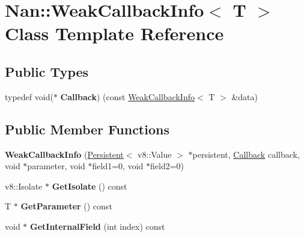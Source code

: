 \hypertarget{class_nan_1_1_weak_callback_info}{}\section{Nan\+:\+:Weak\+Callback\+Info$<$ T $>$ Class Template Reference}
\label{class_nan_1_1_weak_callback_info}
\subsection*{Public Types}
\begin{DoxyCompactItemize}
\item 
\mbox{\label{class_nan_1_1_weak_callback_info_aba0d353c55085d5ce87298db13913565}} 
typedef void($\ast$ {\bfseries Callback}) (const \hyperlink{class_nan_1_1_weak_callback_info}{Weak\+Callback\+Info}$<$ T $>$ \&data)
\end{DoxyCompactItemize}
\subsection*{Public Member Functions}
\begin{DoxyCompactItemize}
\item 
\mbox{\label{class_nan_1_1_weak_callback_info_a380d2eba53960f6c4b2c3699a43b0dcc}} 
{\bfseries Weak\+Callback\+Info} (\hyperlink{class_nan_1_1_persistent}{Persistent}$<$ v8\+::\+Value $>$ $\ast$persistent, \hyperlink{class_nan_1_1_callback}{Callback} callback, void $\ast$parameter, void $\ast$field1=0, void $\ast$field2=0)
\item 
\mbox{\label{class_nan_1_1_weak_callback_info_a0624b0e88da4a2c937e9c76204ad7600}} 
v8\+::\+Isolate $\ast$ {\bfseries Get\+Isolate} () const
\item 
\mbox{\label{class_nan_1_1_weak_callback_info_af0ef1566445fca24d4bd6a134d62aabf}} 
T $\ast$ {\bfseries Get\+Parameter} () const
\item 
\mbox{\label{class_nan_1_1_weak_callback_info_a25e75a1d1e9f9f7cf40f7b46b52d39c4}} 
void $\ast$ {\bfseries Get\+Internal\+Field} (int index) const
\end{DoxyCompactItemize}
